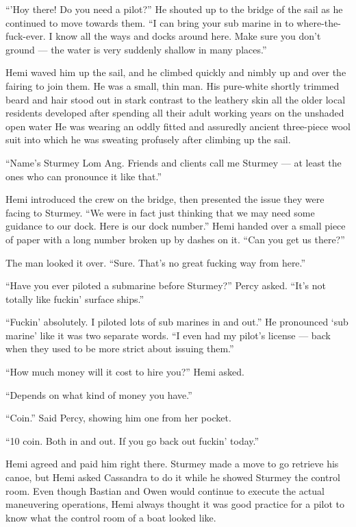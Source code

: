 \documentclass[
]{scrbook}
\begin{document}
``'Hoy there! Do you need a pilot?'' He shouted up to the bridge of the
sail as he continued to move towards them. ``I can bring your sub marine
in to where-the-fuck-ever. I know all the ways and docks around here.
Make sure you don't ground --- the water is very suddenly shallow in
many places.''

Hemi waved him up the sail, and he climbed quickly and nimbly up and
over the fairing to join them. He was a small, thin man. His pure-white
shortly trimmed beard and hair stood out in stark contrast to the
leathery skin all the older local residents developed after spending all
their adult working years on the unshaded open water He was wearing an
oddly fitted and assuredly ancient three-piece wool suit into which he
was sweating profusely after climbing up the sail.

``Name's Sturmey Lom Ang. Friends and clients call me Sturmey --- at
least the ones who can pronounce it like that.''

Hemi introduced the crew on the bridge, then presented the issue they
were facing to Sturmey. ``We were in fact just thinking that we may need
some guidance to our dock. Here is our dock number.'' Hemi handed over a
small piece of paper with a long number broken up by dashes on it. ``Can
you get us there?''

The man looked it over. ``Sure. That's no great fucking way from here.''

``Have you ever piloted a submarine before Sturmey?'' Percy asked.
``It's not totally like fuckin' surface ships.''

``Fuckin' absolutely. I piloted lots of sub marines in and out.'' He
pronounced `sub marine' like it was two separate words. ``I even had my
pilot's license --- back when they used to be more strict about issuing
them.''

``How much money will it cost to hire you?'' Hemi asked.

``Depends on what kind of money you have.''

``Coin.'' Said Percy, showing him one from her pocket.

``10 coin. Both in and out. If you go back out fuckin' today.''

Hemi agreed and paid him right there. Sturmey made a move to go retrieve
his canoe, but Hemi asked Cassandra to do it while he showed Sturmey the
control room. Even though Bastian and Owen would continue to execute the
actual maneuvering operations, Hemi always thought it was good practice
for a pilot to know what the control room of a boat looked like.
\end{document}
